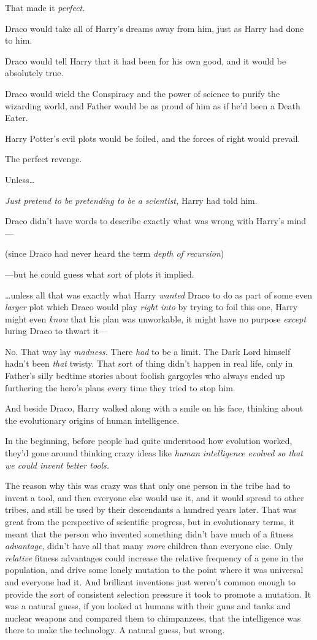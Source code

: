 That made it \emph{perfect.}

Draco would take all of Harry’s dreams away from him, just as Harry had done to him.

Draco would tell Harry that it had been for his own good, and it would be absolutely true.

Draco would wield the Conspiracy and the power of science to purify the wizarding world, and Father would be as proud of him as if he’d been a Death Eater.

Harry Potter’s evil plots would be foiled, and the forces of right would prevail.

The perfect revenge.

Unless…

\emph{Just pretend to be pretending to be a scientist,} Harry had told him.

Draco didn’t have words to describe exactly what was wrong with Harry’s mind—

(since Draco had never heard the term \emph{depth of recursion})

—but he could guess what sort of plots it implied.

…unless all that was exactly what Harry \emph{wanted} Draco to do as part of some even \emph{larger} plot which Draco would play \emph{right into} by trying to foil this one, Harry might even \emph{know} that his plan was unworkable, it might have no purpose \emph{except} luring Draco to thwart it—

No. That way lay \emph{madness.} There \emph{had} to be a limit. The Dark Lord himself hadn’t been \emph{that} twisty. That sort of thing didn’t happen in real life, only in Father’s silly bedtime stories about foolish gargoyles who always ended up furthering the hero’s plans every time they tried to stop him.

\later

And beside Draco, Harry walked along with a smile on his face, thinking about the evolutionary origins of human intelligence.

In the beginning, before people had quite understood how evolution worked, they’d gone around thinking crazy ideas like \emph{human intelligence evolved so that we could invent better tools.}

The reason why this was crazy was that only one person in the tribe had to invent a tool, and then everyone else would use it, and it would spread to other tribes, and still be used by their descendants a hundred years later. That was great from the perspective of scientific progress, but in evolutionary terms, it meant that the person who invented something didn’t have much of a fitness \emph{advantage}, didn’t have all that many \emph{more} children than everyone else. Only \emph{relative} fitness advantages could increase the relative frequency of a gene in the population, and drive some lonely mutation to the point where it was universal and everyone had it. And brilliant inventions just weren’t common enough to provide the sort of consistent selection pressure it took to promote a mutation. It was a natural guess, if you looked at humans with their guns and tanks and nuclear weapons and compared them to chimpanzees, that the intelligence was there to make the technology. A natural guess, but wrong.

